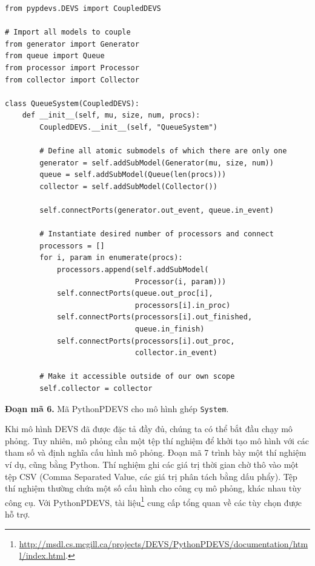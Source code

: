 \begin{verbatim}
from pypdevs.DEVS import CoupledDEVS

# Import all models to couple
from generator import Generator
from queue import Queue
from processor import Processor
from collector import Collector

class QueueSystem(CoupledDEVS):
    def __init__(self, mu, size, num, procs):
        CoupledDEVS.__init__(self, "QueueSystem")

        # Define all atomic submodels of which there are only one
        generator = self.addSubModel(Generator(mu, size, num))
        queue = self.addSubModel(Queue(len(procs)))
        collector = self.addSubModel(Collector())

        self.connectPorts(generator.out_event, queue.in_event)

        # Instantiate desired number of processors and connect
        processors = []
        for i, param in enumerate(procs):
            processors.append(self.addSubModel(
                              Processor(i, param)))
            self.connectPorts(queue.out_proc[i],
                              processors[i].in_proc)
            self.connectPorts(processors[i].out_finished,
                              queue.in_finish)
            self.connectPorts(processors[i].out_proc,
                              collector.in_event)

        # Make it accessible outside of our own scope
        self.collector = collector
\end{verbatim}
\noindent\textbf{Đoạn mã 6.} Mã PythonPDEVS cho mô hình ghép \texttt{System}.

Khi mô hình DEVS đã được đặc tả đầy đủ, chúng ta có thể bắt đầu chạy mô phỏng. Tuy nhiên, mô phỏng cần một tệp thí nghiệm để khởi tạo mô hình với các tham số và định nghĩa cấu hình mô phỏng. Đoạn mã 7 trình bày một thí nghiệm ví dụ, cũng bằng Python. Thí nghiệm ghi các giá trị thời gian chờ thô vào một tệp CSV (Comma Separated Value, các giá trị phân tách bằng dấu phẩy). Tệp thí nghiệm thường chứa một số cấu hình cho công cụ mô phỏng, khác nhau tùy công cụ. Với PythonPDEVS, tài liệu\footnote{\url{http://msdl.cs.mcgill.ca/projects/DEVS/PythonPDEVS/documentation/html/index.html}.} cung cấp tổng quan về các tùy chọn được hỗ trợ.

